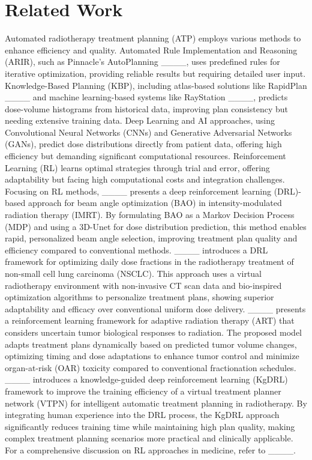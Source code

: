 \section{Related Work}
Automated radiotherapy treatment planning (ATP) employs various methods to enhance efficiency and quality. Automated Rule Implementation and Reasoning (ARIR), such as Pinnacle's AutoPlanning ____, uses predefined rules for iterative optimization, providing reliable results but requiring detailed user input. Knowledge-Based Planning (KBP), including atlas-based solutions like RapidPlan ____ and machine learning-based systems like RayStation ____, predicts dose-volume histograms from historical data, improving plan consistency but needing extensive training data. 
Deep Learning and AI approaches, using Convolutional Neural Networks (CNNs) and Generative Adversarial Networks (GANs), predict dose distributions directly from patient data, offering high efficiency but demanding significant computational resources. Reinforcement Learning (RL) learns optimal strategies through trial and error, offering adaptability but facing high computational costs and integration challenges. Focusing on RL methods, ____ presents a deep reinforcement learning (DRL)-based approach for beam angle optimization (BAO) in intensity-modulated radiation therapy (IMRT). By formulating BAO as a Markov Decision Process (MDP) and using a 3D-Unet for dose distribution prediction, this method enables rapid, personalized beam angle selection, improving treatment plan quality and efficiency compared to conventional methods. ____ introduces a DRL framework for optimizing daily dose fractions in the radiotherapy treatment of non-small cell lung carcinoma (NSCLC). This approach uses a virtual radiotherapy environment with non-invasive CT scan data and bio-inspired optimization algorithms to personalize treatment plans, showing superior adaptability and efficacy over conventional uniform dose delivery. ____ presents a reinforcement learning framework for adaptive radiation therapy (ART) that considers uncertain tumor biological responses to radiation. The proposed model adapts treatment plans dynamically based on predicted tumor volume changes, optimizing timing and dose adaptations to enhance tumor control and minimize organ-at-risk (OAR) toxicity compared to conventional fractionation schedules. ____ introduces a knowledge-guided deep reinforcement learning (KgDRL) framework to improve the training efficiency of a virtual treatment planner network (VTPN) for intelligent automatic treatment planning in radiotherapy. By integrating human experience into the DRL process, the KgDRL approach significantly reduces training time while maintaining high plan quality, making complex treatment planning scenarios more practical and clinically applicable. For a comprehensive discussion on RL approaches in medicine, refer to ____. 

